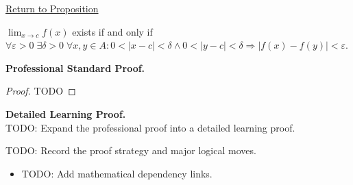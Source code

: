 \newpage
{}
\label{prf:cauchy-criterion-limits}

\begin{remark*}[Return]
\hyperref[prop:cauchy-criterion-limits]{Return to Proposition}
\end{remark*}

\begin{proposition*}
$\lim_{x\to c}f(x)$ exists if and only if $\forall\varepsilon>0\;\exists\delta>0\;\forall x,y \in A: 0<|x-c|<\delta \wedge 0<|y-c|<\delta \Rightarrow |f(x)-f(y)|<\varepsilon$.
\end{proposition*}

\textbf{Professional Standard Proof.}~\\
\begin{proof}
TODO
\end{proof}

\textbf{Detailed Learning Proof.}~\\
TODO: Expand the professional proof into a detailed learning proof.

\begin{remark*}
TODO: Record the proof strategy and major logical moves.
\end{remark*}

\begin{dependencies}
\begin{itemize}
  \item TODO: Add mathematical dependency links.
\end{itemize}
\end{dependencies}
